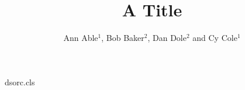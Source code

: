 \begin{filecontents*}[overwrite]{dsorc.cls}
\RequirePackage{hyperref}
\newcommand{\institute}[1]{\gdef\ds@inst{{\itshape #1}}}
\newcommand{\orcid}[1]{\href{https://orcid.org/#1}{(iD)}}
\let\ds@inst\empty
\def\@maketitle{\begin{center}{\LARGE\@title\par}\vskip1em{\large\@author\par}\vskip1em
  {\small\ds@inst\par}\end{center}}
\end{filecontents*}
\documentclass{dsorc}

\title{A Title}
\author{Ann Able$^{1}$, Bob Baker$^{2}$, Dan Dole$^{2}$ and Cy Cole$^{1}$}
\maketitle
Text.

